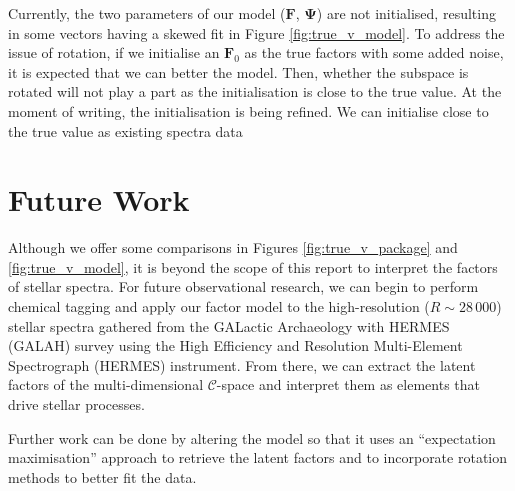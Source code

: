 \documentclass[12pt, letterpaper]{article}
\begin{document}
Currently, the two parameters of our model ($\mathbf{F}$, $\mathbf{\Psi}$) are not initialised, resulting in some vectors having a skewed fit in Figure \ref{fig:true_v_model}. To address the issue of rotation, if we initialise an $\mathbf{F}_0$ as the true factors with some added noise, it is expected that we can better the model. Then, whether the subspace is rotated will not play a part as the initialisation is close to the true value. At the moment of writing, the initialisation is being refined. We can initialise close to the true value as existing spectra data 

%





\section{Future Work}

Although we offer some comparisons in Figures \ref{fig:true_v_package} and \ref{fig:true_v_model}, it is beyond the scope of this report to interpret the factors of stellar spectra. For future observational research, we can begin to perform chemical tagging and apply our factor model to the high-resolution ($R\sim 28\,000$) stellar spectra gathered from the GALactic Archaeology with HERMES (GALAH) survey using the High Efficiency and Resolution Multi-Element Spectrograph (HERMES) instrument. From there, we can extract the latent factors of the multi-dimensional $\mathcal{C}$-space and interpret them as elements that drive stellar processes.

Further work can be done by altering the model so that it uses an ``expectation maximisation'' approach to retrieve the latent factors and to incorporate rotation methods to better fit the data.
\end{document}
